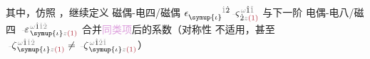其中，仿照 ，继续定义 \textcolor{NavyBlue}{磁偶-电四/磁偶} $\epsilon^{\hphantom{\symup{\iota}}\mathcolor{gray}{\dot{1}}\dot{2}}_{\symup{\iota}} \Xint{\begin{smallmatrix} ~ \\ {}^{}_{\mathcolor{gray}{-}} \\ ~ \end{smallmatrix}}{13}{\varsigma}^{\;\! \mathcolor{gray}{\omega} \hat{1} \mathcolor{gray}{\check{1}}}_{\;\! \dot{2} \mathcolor{gray}{z} \textcolor{Maroon}{(1)}}$ 与下一阶 \textcolor{NavyBlue}{电偶-电八/磁四} $\Xint{\begin{smallmatrix} ~ \\ {}^{}_{\mathcolor{gray}{-}} \\ ~ \end{smallmatrix}}{16}{\varepsilon}^{\;\! \mathcolor{gray}{\omega} \hat{1} \mathcolor{gray}{\check{1} \check{2}}}_{\;\! \symup{\iota} \mathcolor{gray}{z} \textcolor{Maroon}{(1)}}$ 合并\textcolor{Plum}{同类项}后的系数（对称性  不适用，甚至 $\Xint{\begin{smallmatrix} ~ \\ {}^{}_{\mathcolor{gray}{-}} \\ ~ \end{smallmatrix}}{12}{\zeta}^{\;\! \mathcolor{gray}{\omega} \hat{1} \mathcolor{gray}{\check{1} \check{2}}}_{\;\! \symup{\iota} \mathcolor{gray}{z} \textcolor{Maroon}{(1)}} \neq \Xint{\begin{smallmatrix} ~ \\ {}^{}_{\mathcolor{gray}{-}} \\ ~ \end{smallmatrix}}{12}{\zeta}^{\;\! \mathcolor{gray}{\omega} \hat{1} \mathcolor{gray}{\check{2} \check{1}}}_{\;\! \symup{\iota} \mathcolor{gray}{z} \textcolor{Maroon}{(1)}}$）
